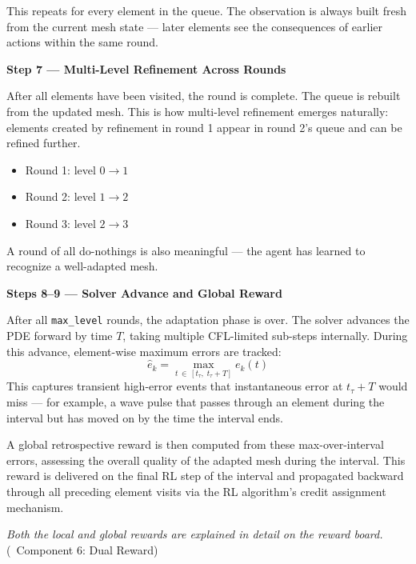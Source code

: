 \documentclass[11pt]{article}
\begin{document}
This repeats for every element in the queue. The observation is always built fresh from the current mesh state --- later elements see the consequences of earlier actions within the same round.

\vspace{0.4cm}

\noindent\textbf{\textcolor{roundcolor}{Step 7 --- Multi-Level Refinement Across Rounds}}

After all elements have been visited, the round is complete. The queue is rebuilt from the updated mesh. This is how multi-level refinement emerges naturally: elements created by refinement in round 1 appear in round 2's queue and can be refined further.

\begin{itemize}[leftmargin=1.5em, itemsep=1pt]
    \item Round 1: level $0 \to 1$
    \item Round 2: level $1 \to 2$
    \item Round 3: level $2 \to 3$
\end{itemize}

A round of all do-nothings is also meaningful --- the agent has learned to recognize a well-adapted mesh.

\vspace{0.4cm}

\noindent\textbf{\textcolor{solvercolor}{Steps 8--9 --- Solver Advance and Global Reward}}

After all \texttt{max\_level} rounds, the adaptation phase is over. The solver advances the PDE forward by time $T$, taking multiple CFL-limited sub-steps internally. During this advance, element-wise maximum errors are tracked:
%
\[
\hat{e}_k = \max_{t \,\in\, [t_\tau,\; t_\tau + T]} e_k(t)
\]
%
This captures transient high-error events that instantaneous error at $t_\tau + T$ would miss --- for example, a wave pulse that passes through an element during the interval but has moved on by the time the interval ends.

A global retrospective reward is then computed from these max-over-interval errors, assessing the overall quality of the adapted mesh during the interval. This reward is delivered on the final RL step of the interval and propagated backward through all preceding element visits via the RL algorithm's credit assignment mechanism.

\textit{Both the local and global rewards are explained in detail on the reward board.} (\textcolor{calloutcolor}{\textrightarrow~Component 6: Dual Reward})
\end{document}
